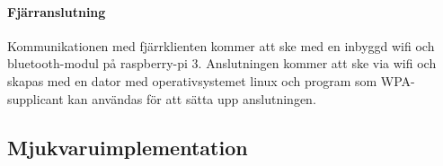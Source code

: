 \documentclass[designspec/spec.tex]{subfiles}
\begin{document}
\paragraph{Fjärranslutning}
Kommunikationen med fjärrklienten kommer att ske med en inbyggd wifi och
bluetooth-modul på raspberry-pi 3. Anslutningen kommer att ske via wifi och skapas med en dator
med operativsystemet linux och program som WPA-supplicant kan användas för att
sätta upp anslutningen.

\subsection{Mjukvaruimplementation}
\end{document}
